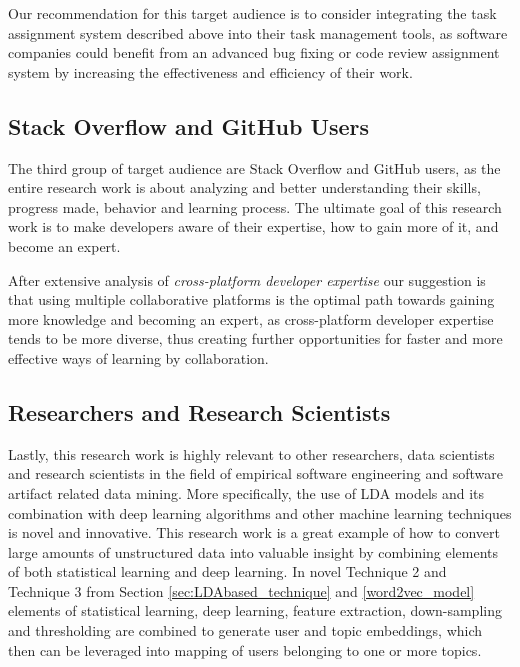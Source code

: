             Our recommendation for this target audience is to consider integrating the task assignment system described above into their task management tools, as software companies could benefit from an advanced bug fixing or code review assignment system by increasing the effectiveness and efficiency of their work.
        
        \subsection{Stack Overflow and GitHub Users}
        
            The third group of target audience are Stack Overflow and GitHub users, as the entire research work is about analyzing and better understanding their skills, progress made, behavior and learning process. The ultimate goal of this research work is to make developers aware of their expertise, how to gain more of it, and become an expert. 
            
            After extensive analysis of \emph{cross-platform developer expertise} our suggestion is that using multiple collaborative platforms is the optimal path towards gaining more knowledge and becoming an expert, as cross-platform developer expertise tends to be more diverse, thus creating further opportunities for faster and more effective ways of learning by collaboration. 
            
        \subsection{Researchers and Research Scientists}
        
            Lastly, this research work is highly relevant to other researchers, data scientists and research scientists in the field of empirical software engineering and software artifact related data mining. More specifically, the use of LDA models and its combination with deep learning algorithms and other machine learning techniques is novel and innovative. This research work is a great example of how to convert large amounts of unstructured data into valuable insight by combining elements of both statistical learning and deep learning. In novel Technique 2 and Technique 3 from Section \ref{sec:LDAbased_technique} and \ref{word2vec_model} elements of statistical learning, deep learning, feature extraction, down-sampling and thresholding are combined to generate user and topic embeddings, which then can be leveraged into mapping of users belonging to one or more topics. 
            
